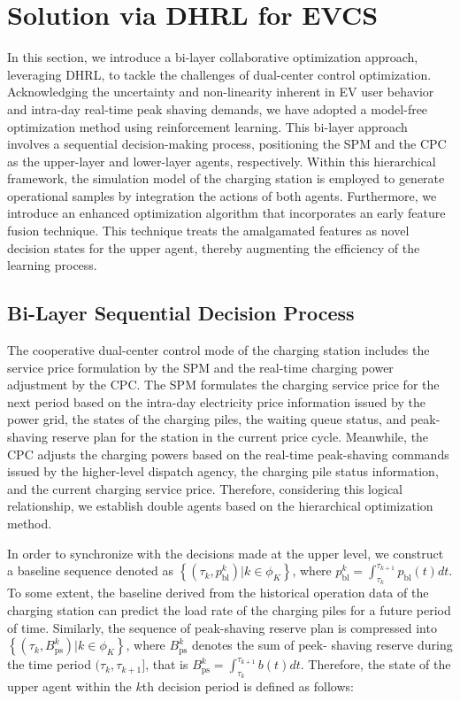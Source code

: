 \documentclass[preprint,12pt]{elsarticle}
\begin{document}
\section{Solution via DHRL for EVCS}

In this section, we introduce a bi-layer collaborative optimization approach, leveraging DHRL, to tackle the challenges of dual-center control optimization. Acknowledging the uncertainty and non-linearity inherent in EV user behavior and intra-day real-time peak shaving demands, we have adopted a model-free optimization method using reinforcement learning. This bi-layer approach involves a sequential decision-making process, positioning the SPM and the CPC as the upper-layer and lower-layer agents, respectively. Within this hierarchical framework, the simulation model of the charging station is employed to generate operational samples by integration the actions of both agents. Furthermore, we introduce an enhanced optimization algorithm that incorporates an early feature fusion technique. This technique treats the amalgamated features as novel decision states
for the upper agent, thereby augmenting the efficiency of the learning
process.

\subsection{Bi-Layer Sequential Decision Process}

The cooperative dual-center control mode of the charging station includes
the service price formulation by the SPM and the real-time charging
power adjustment by the CPC. The SPM formulates the charging service
price for the next period based on the intra-day electricity price
information issued by the power grid, the states of the charging piles,
the waiting queue status, and\emph{ }peak-shaving reserve plan for
the station\emph{ }in the current price cycle. Meanwhile, the CPC
adjusts the charging powers based on the real-time peak-shaving commands
issued by the higher-level dispatch agency, the charging pile status
information, and the current charging service price. Therefore, considering
this logical relationship, we establish double agents based on the
hierarchical optimization method.

In order to synchronize with the decisions made at the upper level,
we construct a baseline sequence denoted as $\left\{ \left(\tau_{k},p_{\textrm{bl}}^{k}\right)|k\in\phi_{K}\right\} $,
where $p_{\textrm{bl}}^{k}=\int_{\tau_{k}}^{\tau_{k+1}}p_{\textrm{bl}}(t)dt$. To some extent, the baseline derived from the historical operation
data of the charging station can predict the load rate of the charging
piles for a future period of time. Similarly, the sequence of peak-shaving
reserve plan is compressed into $\left\{ \left(\tau_{k},B_{\textrm{ps}}^{k}\right)|k\in\phi_{K}\right\} $,
where $B_{\textrm{ps}}^{k}$ denotes the sum of peek- shaving reserve
during the time period $(\tau_{k},\tau_{k+1}]$, that is $B_{\textrm{ps}}^{k}=\int_{\tau_{k}}^{\tau_{k+1}}b(t)dt$.
Therefore, the state of the upper agent within the $k$th decision
period is defined as follows:
\end{document}
